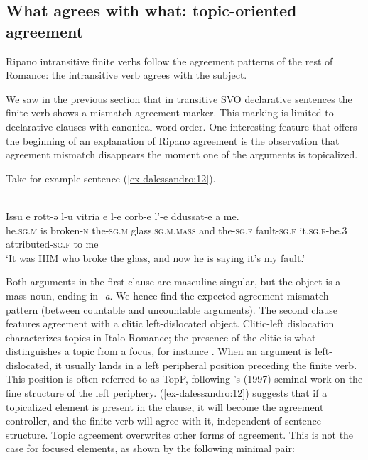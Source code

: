 \documentclass[output=paper
,modfonts
,nonflat]{langsci/langscibook}
\begin{document}
\subsection{ What agrees with what: topic-oriented agreement} \label{sec-dalessandro:2.2}
Ripano intransitive finite verbs follow the agreement patterns of the rest of Romance: the intransitive verb agrees with the subject.

We saw in the previous section that in transitive SVO declarative sentences the finite verb shows a mismatch agreement marker. This marking is limited to declarative clauses with canonical word order. One interesting feature that offers the beginning of an explanation of Ripano agreement is the observation that agreement mismatch disappears the moment one of the arguments is topicalized. 

Take for example sentence (\ref{ex-dalessandro:12}). 

\begin{exe}
\ex \label{ex-dalessandro:12}\citet[51]{Rossi2008}\\
\gll Issu   e   rott-ə     l-u     vitria  e   l-e     corb-e   l’-e     ddussat-e     a me.\\
he.\textsc{sg.m} is  broken-\textsc{n} the-\textsc{sg.m} glass.\textsc{sg.m.mass} and  the-\textsc{sg.f} fault-\textsc{sg.f} it.\textsc{sg.f-}be.3  attributed-\textsc{sg.f} to me\\
\glt `It was HIM who broke the glass, and now he is saying it’s my fault.'
\end{exe}
Both arguments in the first clause are masculine singular, but the object is a mass noun, ending in -\textit{a}. We hence find the expected agreement mismatch pattern (between countable and uncountable arguments). The second clause features agreement with a clitic left-dislocated object. Clitic-left dislocation characterizes topics in Italo-Romance; the presence of the clitic is what distinguishes a topic from a focus, for instance \citep{Cinque1983}. When an argument is left-dislocated, it usually lands in a left peripheral position preceding the finite verb. This position is often referred to as TopP, following \citeauthor{Rizzi1997}'s (1997) seminal work on the fine structure of the left periphery. 
(\ref{ex-dalessandro:12}) suggests that if a topicalized element is present in the clause, it will become the agreement controller, and the finite verb will agree with it, independent of sentence structure. Topic agreement overwrites other forms of agreement. This is not the case for focused elements, as shown by the following minimal pair:
\end{document}
